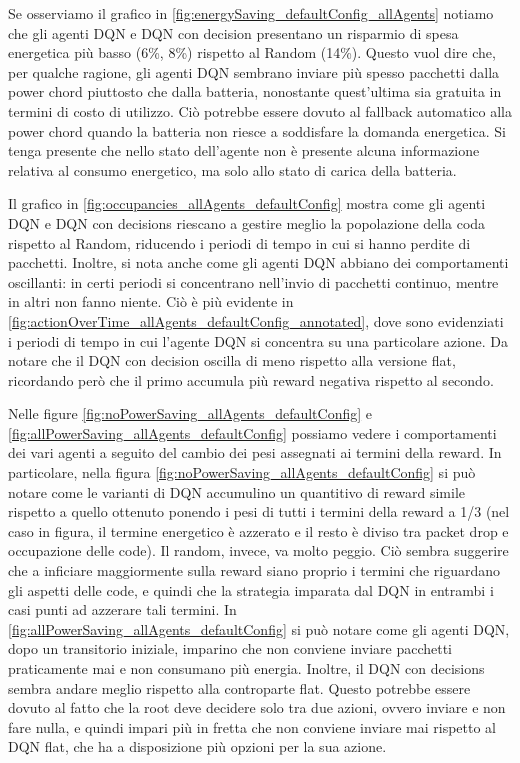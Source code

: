 \documentclass[conference]{IEEEtran}
\begin{document}
Se osserviamo il grafico in \autoref{fig:energySaving_defaultConfig_allAgents} notiamo
che gli agenti DQN e DQN con decision presentano un risparmio di spesa energetica più
basso (6\%, 8\%) rispetto al Random (14\%). Questo vuol dire che, per qualche ragione,
gli agenti DQN
sembrano inviare più spesso pacchetti dalla power chord piuttosto che dalla batteria,
nonostante quest'ultima sia gratuita in termini di costo di utilizzo. Ciò potrebbe
essere dovuto al fallback automatico alla power chord quando la batteria non riesce
a soddisfare la domanda energetica. Si tenga presente che nello stato dell'agente non
è presente alcuna informazione relativa al consumo energetico, ma solo allo stato
di carica della batteria.

Il grafico in \autoref{fig:occupancies_allAgents_defaultConfig} mostra come gli agenti
DQN e DQN con decisions riescano a gestire meglio la popolazione della coda rispetto al
Random, riducendo i periodi di tempo in cui si hanno perdite di pacchetti. Inoltre,
si nota anche come gli agenti DQN abbiano dei comportamenti oscillanti: in certi periodi
si concentrano nell'invio di pacchetti continuo, mentre in altri non fanno niente. Ciò
è più evidente in \autoref{fig:actionOverTime_allAgents_defaultConfig_annotated}, dove
sono evidenziati i periodi di tempo in cui l'agente DQN si concentra su una particolare
azione. Da notare che il DQN con decision oscilla di meno rispetto alla versione flat,
ricordando però che il primo accumula più reward negativa rispetto al secondo.

Nelle figure \autoref{fig:noPowerSaving_allAgents_defaultConfig} e 
\autoref{fig:allPowerSaving_allAgents_defaultConfig} possiamo vedere i comportamenti dei
vari agenti a seguito del cambio dei pesi assegnati ai termini della reward. In
particolare, nella figura \autoref{fig:noPowerSaving_allAgents_defaultConfig} si può
notare come le varianti di DQN accumulino un quantitivo di reward simile rispetto a
quello ottenuto ponendo i pesi di tutti i termini della reward a 1/3 (nel caso in figura,
il termine energetico è azzerato e il resto è diviso tra packet drop e occupazione
delle code). Il random, invece, va molto peggio. Ciò sembra suggerire che a inficiare
maggiormente sulla reward siano proprio i termini che riguardano gli aspetti delle code,
e quindi che la strategia imparata dal DQN in entrambi i casi punti ad azzerare tali
termini. In \autoref{fig:allPowerSaving_allAgents_defaultConfig} si può notare come
gli agenti DQN, dopo un transitorio iniziale, imparino che non conviene inviare pacchetti
praticamente mai e non consumano più energia. Inoltre, il DQN con decisions sembra 
andare meglio rispetto alla controparte flat. Questo potrebbe essere dovuto al fatto
che la root deve decidere solo tra due azioni, ovvero inviare e non fare nulla, e quindi
impari più in fretta che non conviene inviare mai rispetto al DQN flat, che ha a 
disposizione più opzioni per la sua azione.
\end{document}
